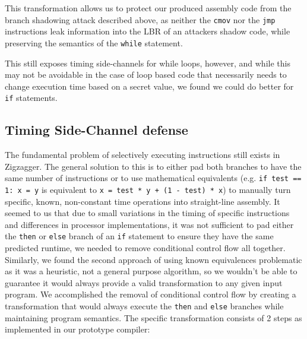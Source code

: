 \documentclass[sigplan, review]{acmart}
\begin{document}
This transformation allows us to protect our produced assembly code from the branch shadowing attack described above, as neither the \texttt{cmov} nor the \texttt{jmp} instructions leak information into the LBR of an attackers shadow code, while preserving the semantics of the \texttt{while} statement.

This still exposes timing side-channels for while loops, however, and while this may not be avoidable in the case of loop based code that necessarily needs to change execution time based on a secret value, we found we could do better for \texttt{if} statements.

\subsection{Timing Side-Channel defense}
The fundamental problem of selectively executing instructions still exists in Zigzagger. The general solution to this is to either pad both branches to have the same number of instructions or to use mathematical equivalents (e.g. \texttt{if test == 1: x = y} is equivalent to \texttt{x = test * y + (1 - test) * x}) to manually turn specific, known, non-constant time operations into straight-line assembly. It seemed to us that due to small variations in the timing of specific instructions and differences in processor implementations, it was not sufficient to pad either the \texttt{then} or \texttt{else} branch of an \texttt{if} statement to ensure they have the same predicted runtime, we needed to remove conditional control flow all together. Similarly, we found the second approach of using known equivalences problematic as it was a heuristic, not a general purpose algorithm, so we wouldn’t be able to guarantee it would always provide a valid transformation to any given input program. We accomplished the removal of conditional control flow by creating a transformation that would always execute the \texttt{then} and \texttt{else} branches while maintaining program semantics. The specific transformation consists of 2 steps as implemented in our prototype compiler:
\end{document}
